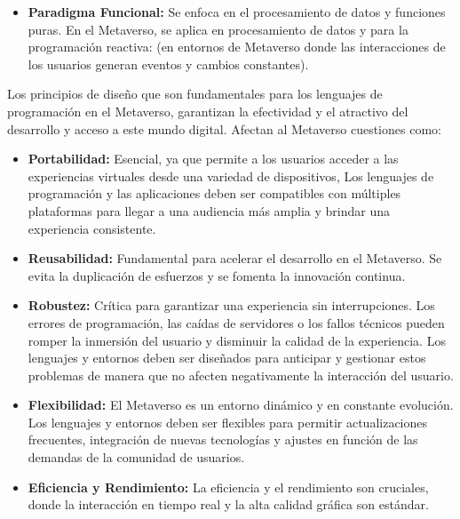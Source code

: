 \documentclass[a4paper,10pt]{article}
\begin{document}
{\begin{itemize}
			\item \textbf{Paradigma Funcional:} Se enfoca en el procesamiento de datos y funciones puras. En el Metaverso, se aplica en procesamiento de datos y para la programación reactiva: (en entornos de Metaverso donde las interacciones de los usuarios generan eventos y cambios constantes).
		\end{itemize}
		Los principios de diseño que son fundamentales para los lenguajes de programación en el Metaverso, garantizan la efectividad y el atractivo del desarrollo y acceso a este mundo digital. Afectan al Metaverso cuestiones como:
		\begin{itemize}
			\item \textbf{Portabilidad:} Esencial, ya que permite a los usuarios acceder a las experiencias virtuales desde una variedad de dispositivos, Los lenguajes de programación y las aplicaciones deben ser compatibles con múltiples plataformas para llegar a una audiencia más amplia y brindar una experiencia consistente.
			\item \textbf{Reusabilidad:} Fundamental para acelerar el desarrollo en el Metaverso. Se evita la duplicación de esfuerzos y se fomenta la innovación continua.
			\item \textbf{Robustez:} Crítica para garantizar una experiencia sin interrupciones. Los errores de programación, las caídas de servidores o los fallos técnicos pueden romper la inmersión del usuario y disminuir la calidad de la experiencia. Los lenguajes y entornos deben ser diseñados para anticipar y gestionar estos problemas de manera que no afecten negativamente la interacción del usuario.
			\item \textbf{Flexibilidad:} El Metaverso es un entorno dinámico y en constante evolución. Los lenguajes y entornos deben ser flexibles para permitir actualizaciones frecuentes, integración de nuevas tecnologías y ajustes en función de las demandas de la comunidad de usuarios.
			\item \textbf{Eficiencia y Rendimiento:} La eficiencia y el rendimiento son cruciales, donde la interacción en tiempo real y la alta calidad gráfica son estándar.
		\end{itemize}}
\end{document}
